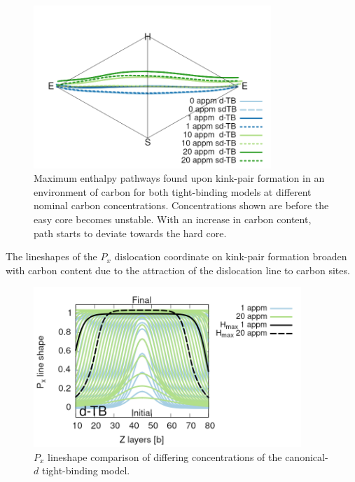 \documentclass[a4paper,11pt]{article}
\begin{document}
\begin{figure}[htbp]
\centering
\includegraphics[width=0.8\textwidth]{Images/pathway_equilibrium_sdTB_dTB_20appm_all.png}
\caption{Maximum enthalpy pathways found upon kink-pair formation in an environment of carbon for both tight-binding models at different nominal carbon concentrations. Concentrations shown are before the easy core becomes unstable. With an increase in carbon content, path starts to deviate towards the hard core. \label{fig:kpequibpath}}
\end{figure}

The lineshapes of the \(P_x\) dislocation coordinate on kink-pair formation broaden with carbon
content due to the attraction of the dislocation line to carbon sites.

\begin{figure}[htbp]
\centering
\includegraphics[width=0.9\textwidth]{Images/lineshapes_dtb_moving_sites_labelled18.png}
\caption{\(P_x\) lineshape comparison of differing concentrations of the canonical-\(d\) tight-binding model.}
\end{figure}
\end{document}
